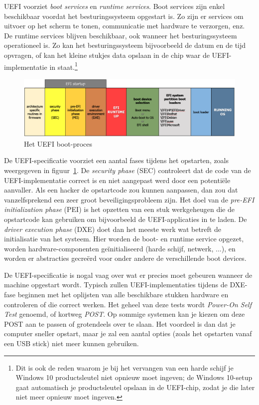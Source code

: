 UEFI voorziet \emph{boot services} en \emph{runtime services}. Boot services zijn enkel beschikbaar voordat het besturingssysteem opgestart is. Zo zijn er services om uitvoer op het scherm te tonen, communicatie met hardware te verzorgen, enz. De runtime services blijven beschikbaar, ook wanneer het besturingssysteem operationeel is. Zo kan het besturingssysteem bijvoorbeeld de datum en de tijd opvragen, of kan het kleine stukjes data opslaan in de chip waar de UEFI-implementatie in staat.\footnote{Dit is ook de reden waarom je bij het vervangen van een harde schijf je Windows 10 productsleutel niet opnieuw moet ingeven; de Windows 10-setup gaat automatisch je productsleutel opslaan in de UEFI-chip, zodat je die later niet meer opnieuw moet ingeven.}

\begin{figure}
\centering
\includegraphics[scale=.25]{images/uefisartup.png}
\caption{Het UEFI boot-proces}
\label{uefiboot}
\end{figure}

De UEFI-specificatie voorziet een aantal fases tijdens het opstarten, zoals weergegeven in figuur~\ref{uefiboot}.
De \emph{security phase} (SEC) controleert dat de code van de UEFI-implementatie correct is en niet aangepast
werd door een potenti\"ele aanvaller. Als een hacker de opstartcode zou kunnen aanpassen, dan zou dat vanzelfsprekend
een zeer groot beveiligingsprobleem zijn. Het doel van de \emph{pre-EFI initialization phase} (PEI) is het opzetten van
een stuk werkgeheugen die de opstartcode kan gebruiken om bijvoorbeeld de UEFI-applicaties in te laden. De \emph{driver
execution phase} (DXE) doet dan het meeste werk wat betreft de initialisatie van het systeem. Hier worden de boot- en
runtime service opgezet, worden hardware-componenten ge\"initialiseerd (harde schijf, netwerk, ...), en worden er abstracties
gecre\"erd voor onder andere de verschillende boot devices.

De UEFI-specificatie is nogal vaag over wat er precies moet gebeuren wanneer de machine opgestart wordt. Typisch zullen
UEFI-implementaties tijdens de DXE-fase beginnen met het oplijsten van alle beschikbare stukken hardware en controleren
of die correct werken. Het geheel van deze tests wordt \emph{Power-On Self Test} genoemd, of
kortweg \emph{POST}. Op sommige systemen kan je kiezen om deze POST aan te passen of grotendeels over te slaan. Het
voordeel is dan dat je computer sneller opstart, maar je zal een aantal opties (zoals het opstarten vanaf een USB stick)
niet meer kunnen gebruiken.

